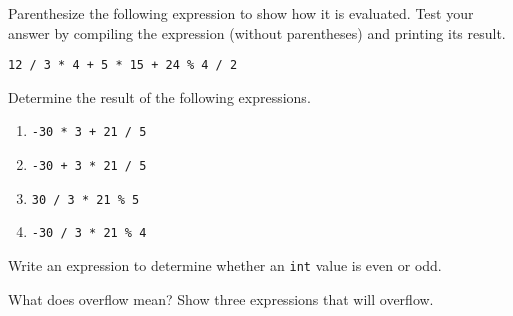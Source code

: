 %
%
\begin{question}
Parenthesize the following expression to show how it is
evaluated. Test your answer by compiling the expression (without
parentheses) and printing its result.
\begin{lstlisting}
12 / 3 * 4 + 5 * 15 + 24 % 4 / 2
\end{lstlisting}
\end{question}

\begin{question}
Determine the result of the following expressions.
\begin{enumerate}[label=(\alph*)]
^^I\item \verb|-30 * 3 + 21 / 5|
^^I\item \verb|-30 + 3 * 21 / 5|
^^I\item \verb|30 / 3 * 21 % 5|
^^I\item \verb|-30 / 3 * 21 % 4|
\end{enumerate}
\end{question}

\begin{question}
Write an expression to determine whether an \verb|int| value is even or odd.
\end{question}

\begin{question}
What does overflow mean? Show three expressions that will overflow.
\end{question}
